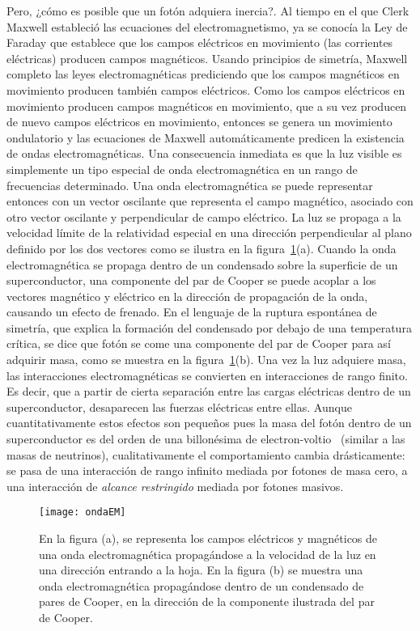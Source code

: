 Pero, ¿cómo es posible que un fotón adquiera inercia?. Al tiempo en el que Clerk Maxwell estableció las ecuaciones del electromagnetismo, ya se conocía la Ley de Faraday que establece que los campos eléctricos en movimiento (las corrientes eléctricas) producen campos magnéticos. Usando principios de simetría, Maxwell completo las leyes electromagnéticas prediciendo que los campos magnéticos en movimiento producen también campos eléctricos. Como los campos eléctricos en movimiento producen campos magnéticos en movimiento, que a su vez producen de nuevo campos eléctricos en movimiento, entonces se genera un movimiento ondulatorio y las ecuaciones de Maxwell automáticamente predicen la existencia de ondas electromagnéticas. Una consecuencia inmediata es que la luz visible es simplemente un tipo especial de onda electromagnética en un rango de frecuencias determinado. Una onda electromagnética se puede representar entonces con un vector oscilante que representa el campo magnético, asociado con otro vector oscilante y perpendicular de campo eléctrico. La luz se propaga a la velocidad límite de la relatividad especial en una dirección perpendicular al plano definido por los dos vectores como se ilustra en la figura~\ref{fig:2}(a). Cuando la onda electromagnética se propaga dentro de un condensado sobre la superficie de un superconductor, una componente del par de Cooper se puede acoplar a los vectores magnético y eléctrico en la dirección de propagación de la onda, causando un efecto de frenado. En el lenguaje de la ruptura espontánea de simetría, que explica la formación del condensado por debajo de una temperatura crítica, se dice que fotón se come una componente del par de Cooper para así adquirir masa, como se muestra en la figura~\ref{fig:2}(b). Una vez la luz adquiere masa, las interacciones electromagnéticas se convierten en interacciones de rango finito. Es decir, que a partir de cierta separación entre las cargas eléctricas dentro de un superconductor, desaparecen las fuerzas eléctricas entre ellas. Aunque cuantitativamente estos efectos son pequeños pues la masa del fotón dentro de un superconductor es del orden de una billonésima de electron-voltio~\cite{beamline} (similar a las masas de neutrinos), cualitativamente el comportamiento cambia drásticamente: se pasa de una interacción de rango infinito mediada por fotones de masa cero, a una interacción de \emph{alcance restringido} mediada por fotones masivos. 

\begin{figure}
  \centering
  \texttt{[image: ondaEM]}
  \caption{En la figura (a), se representa los campos eléctricos y magnéticos de una onda electromagnética propagándose a la velocidad de la luz en una dirección entrando a la hoja. En  la figura (b) se muestra una onda electromagnética propagándose dentro de un condensado de pares de Cooper, en la dirección de la componente ilustrada del par de Cooper.}
  \label{fig:2}
\end{figure}


